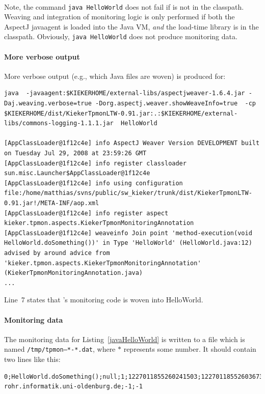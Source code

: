 \documentclass[a4paper,12pt]{scrartcl}
\begin{document}
\

Note, the command \texttt{java  HelloWorld} does not fail if \tpmon{} is not in the classpath. Weaving and integration of monitoring logic is only performed if both the AspectJ javaagent is loaded into the Java VM, \textit{and} the \tpmon{} load-time library is in the classpath. Obviously, \texttt{java  HelloWorld} does not produce monitoring data.

\paragraph{More verbose output}
More verbose output (e.g., which Java files are woven) is produced for:
\begin{lstlisting}[caption={Verbose execution with AspectJ's Java agent.},label={lst2},language=clean,basicstyle=\ttfamily\footnotesize,keywordstyle=\ttfamily\footnotesize]
java  -javaagent:$KIEKERHOME/external-libs/aspectjweaver-1.6.4.jar -Daj.weaving.verbose=true -Dorg.aspectj.weaver.showWeaveInfo=true  -cp $KIEKERHOME/dist/KiekerTpmonLTW-0.91.jar:.:$KIEKERHOME/external-libs/commons-logging-1.1.1.jar  HelloWorld

[AppClassLoader@1f12c4e] info AspectJ Weaver Version DEVELOPMENT built on Tuesday Jul 29, 2008 at 23:59:26 GMT
[AppClassLoader@1f12c4e] info register classloader sun.misc.Launcher$AppClassLoader@1f12c4e
[AppClassLoader@1f12c4e] info using configuration file:/home/matthias/svns/public/sw_kieker/trunk/dist/KiekerTpmonLTW-0.91.jar!/META-INF/aop.xml
[AppClassLoader@1f12c4e] info register aspect kieker.tpmon.aspects.KiekerTpmonMonitoringAnnotation
[AppClassLoader@1f12c4e] weaveinfo Join point 'method-execution(void HelloWorld.doSomething())' in Type 'HelloWorld' (HelloWorld.java:12) advised by around advice from 'kieker.tpmon.aspects.KiekerTpmonMonitoringAnnotation' (KiekerTpmonMonitoringAnnotation.java)
...
\end{lstlisting}
Line~7 states that \tpmon{}'s monitoring code is woven into HelloWorld.

\paragraph{Monitoring data}
The monitoring data for Listing~\ref{javaHelloWorld} is written to a file which is named \texttt{/tmp/tpmon--*-*.dat}, where $*$ represents some number. It should contain two lines like this:
\begin{lstlisting}[caption={Example monitoring data},label={OutputHelloWorld2},language=clean,basicstyle=\ttfamily\footnotesize,keywordstyle=\ttfamily\footnotesize]
0;HelloWorld.doSomething();null;1;1227011855260241503;1227011855260367357;pc-rohr.informatik.uni-oldenburg.de;-1;-1
\end{lstlisting}
\end{document}
